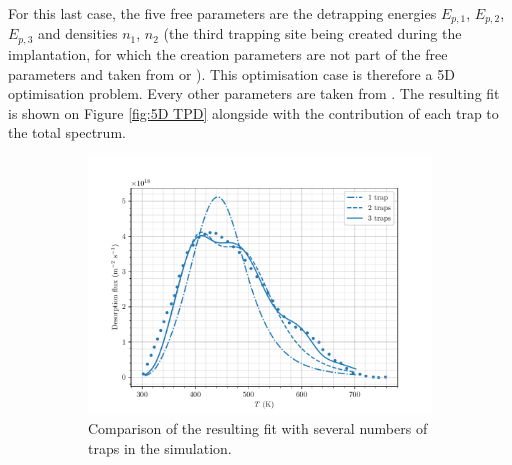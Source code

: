 For this last case, the five free parameters are the detrapping energies $E_{p, 1}$, $E_{p, 2}$, $E_{p, 3}$ and densities $n_1$, $n_2$ (the third trapping site being created during the implantation, for which the creation parameters are not part of the free parameters and taken from  or ).
This optimisation case is therefore a 5D optimisation problem.
Every other parameters are taken from .
The resulting fit is shown on Figure \ref{fig:5D TPD} alongside with the contribution of each trap to the total spectrum.
\begin{figure} [ht]
    \centering
        \begin{subfigure}[t]{0.5\linewidth}
            \centering
            \captionsetup{width=.9\linewidth}
            \includegraphics[width=\linewidth]{Figures/Chapter3/Parametric_optimisation/number_of_traps.pdf}
            \caption{Comparison of the resulting fit with several numbers of traps in the simulation.}
            \label{fig:number of traps comparison}
        \end{subfigure}%
        \begin{subfigure}[t]{0.5\linewidth}
            \centering
            \captionsetup{width=.9\linewidth}

\end{subfigure}
\end{figure}
